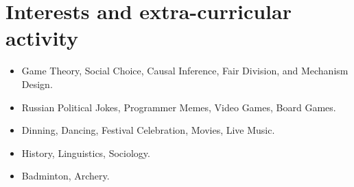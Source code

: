 \documentclass[12pt,a4paper,sans]{moderncv}        %
\begin{document}
\section{Interests and extra-curricular activity}

\vspace{6pt}

\begin{itemize}

\item{Game Theory, Social Choice, Causal Inference, Fair Division, and Mechanism Design.}
\item{Russian Political Jokes, Programmer Memes, Video Games, Board Games.}
\item{Dinning, Dancing, Festival Celebration, Movies, Live Music.}
\item{History, Linguistics, Sociology.}
\item{Badminton, Archery.}

% 
% 
% 
% 
\end{itemize}
% 
% 
%  
% 
% 


\end{document}
